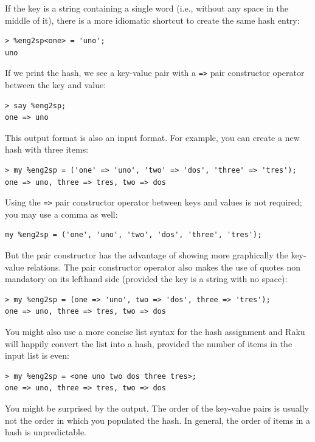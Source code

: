 If the key is a string containing a single word (i.e., 
without any space in the middle of it), there is a more 
idiomatic shortcut to create the same hash entry:

\begin{verbatim}
> %eng2sp<one> = 'uno';
uno
\end{verbatim}
%

If we print the hash, we see a key-value pair with a 
\verb'=>' pair constructor operator between the key 
and value:

\begin{verbatim}
> say %eng2sp;
one => uno
\end{verbatim}
%
This output format is also an input format.  For example,
you can create a new hash with three items:

\begin{verbatim}
> my %eng2sp = ('one' => 'uno', 'two' => 'dos', 'three' => 'tres');
one => uno, three => tres, two => dos
\end{verbatim}
%

Using the \verb'=>' pair constructor operator between keys and 
values is not required; you may use a comma as well:

\begin{verbatim}
my %eng2sp = ('one', 'uno', 'two', 'dos', 'three', 'tres');
\end{verbatim}
%

But the pair constructor has the advantage of showing more 
graphically the key-value relations. The pair constructor 
operator also makes the use of quotes non mandatory on its 
lefthand side (provided the key is a string with no space):

\begin{verbatim}
> my %eng2sp = (one => 'uno', two => 'dos', three => 'tres');
one => uno, three => tres, two => dos
\end{verbatim}
%

You might also use a more concise list syntax for the hash 
assignment and Raku will happily convert the list into a 
hash, provided the number of items in the input list is even:

\begin{verbatim}
> my %eng2sp = <one uno two dos three tres>;
one => uno, three => tres, two => dos
\end{verbatim}
%

You might be surprised by the output. The order of the 
key-value pairs is usually not the order in which you 
populated the hash. In general, the order 
of items in a hash is unpredictable.


